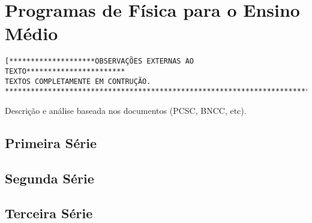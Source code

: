 \chapter{Programas de Física para o Ensino Médio}
\begin{verbatim}
[********************OBSERVAÇÕES EXTERNAS AO TEXTO***********************
TEXTOS COMPLETAMENTE EM CONTRUÇÃO.
*************************************************************************]
\end{verbatim}
Descrição e análise baseada nos documentos (PCSC, BNCC, etc).
\section{Primeira Série}
\section{Segunda Série}
\section{Terceira Série}

